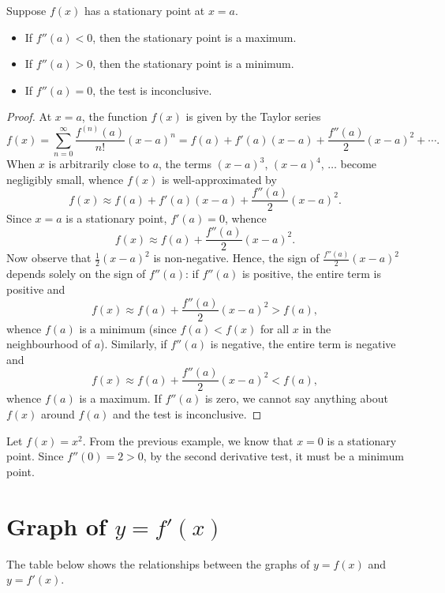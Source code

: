 \begin{proposition}\label{prop:Second-Derivative-Test}
    Suppose $f(x)$ has a stationary point at $x = a$.
    \begin{itemize}
        \item If $f''(a) < 0$, then the stationary point is a maximum.
        \item If $f''(a) > 0$, then the stationary point is a minimum.
        \item If $f''(a) = 0$, the test is inconclusive.
    \end{itemize}
\end{proposition}
\begin{proof}
    At $x = a$, the function $f(x)$ is given by the Taylor series \[f(x) = \sum_{n = 0}^\infty \frac{f^{(n)}(a)}{n!} (x-a)^n = f(a) + f'(a) (x-a) + \frac{f''(a)}{2} (x-a)^2 + \cdots.\] When $x$ is arbitrarily close to $a$, the terms $(x-a)^3$, $(x-a)^4$, $\dots$ become negligibly small, whence $f(x)$ is well-approximated by \[f(x) \approx f(a) + f'(a) (x-a) + \frac{f''(a)}{2} (x-a)^2.\] Since $x = a$ is a stationary point, $f'(a) = 0$, whence \[f(x) \approx f(a) + \frac{f''(a)}{2} (x-a)^2.\] Now observe that $\frac12 (x-a)^2$ is non-negative. Hence, the sign of $\frac{f''(a)}{2} (x-a)^2$ depends solely on the sign of $f''(a)$: if $f''(a)$ is positive, the entire term is positive and \[f(x) \approx f(a) + \frac{f''(a)}{2} (x-a)^2 > f(a),\] whence $f(a)$ is a minimum (since $f(a) < f(x)$ for all $x$ in the neighbourhood of $a$). Similarly, if $f''(a)$ is negative, the entire term is negative and \[f(x) \approx f(a) + \frac{f''(a)}{2} (x-a)^2 < f(a),\] whence $f(a)$ is a maximum. If $f''(a)$ is zero, we cannot say anything about $f(x)$ around $f(a)$ and the test is inconclusive.
\end{proof}

\begin{example}
    Let $f(x) = x^2$. From the previous example, we know that $x = 0$ is a stationary point. Since $f''(0) = 2 > 0$, by the second derivative test, it must be a minimum point.
\end{example}

\section{Graph of \texorpdfstring{$y = f'(x)$}{y = f'(x)}}

The table below shows the relationships between the graphs of $y = f(x)$ and $y = f'(x)$.

